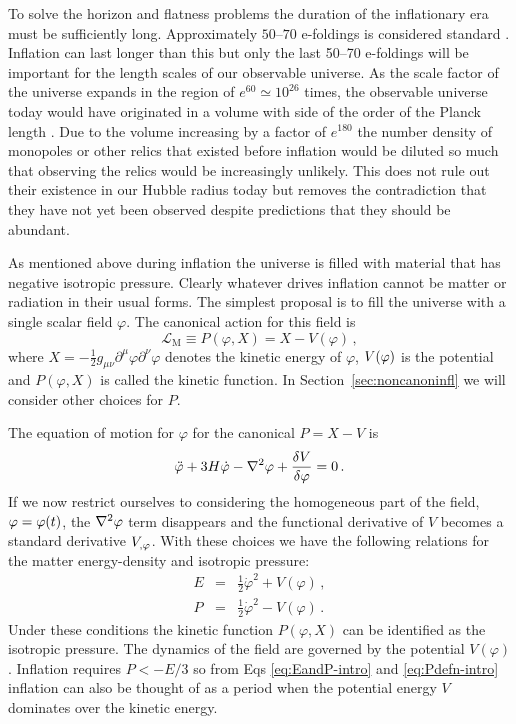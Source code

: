 To solve the horizon and flatness problems the duration of the inflationary era
must be
sufficiently long. Approximately $50$--$70$ e-foldings is considered standard
\cite{book:liddle}. Inflation
can last longer than this but only the last 50--70 e-foldings will be important
for the length scales of our observable universe. As the scale factor of the
universe expands
in the region of $e^{60}\simeq 10^{26}$ times, the observable universe
today would
have originated in a volume with side of the order of the Planck length
\cite{book:dodelson}.
Due to the volume increasing by a factor of $e^{180}$ the number density
of monopoles or other relics that existed before inflation would be
diluted so much that observing the relics would be increasingly unlikely. This
does not rule out their existence in our Hubble radius today but removes the
contradiction that they have not yet been observed despite predictions that
they should be abundant.


As mentioned above during inflation the universe is filled with material that
has negative isotropic pressure.
Clearly whatever drives inflation cannot be matter or radiation in their usual
forms. The simplest proposal is to fill the universe with a single scalar field
$\varphi$. The canonical action for this field is
\begin{equation}
\label{eq:phiaction-intro}
 \mathcal{L}_\mathrm{M} \equiv P(\varphi, X) = X -V(\varphi) \,,
\end{equation}
where $X=-\frac{1}{2}g_{\mu\nu}\partial^\mu\varphi \partial^\nu\varphi$ denotes
the kinetic energy of $\varphi$, $V(\varphi)$ is the potential and $P(\varphi, X)$
is called the kinetic
function. In Section~\ref{sec:noncanoninfl} we will consider other
choices for $P$. 

The equation of motion for $\varphi$ for the canonical $P=X-V$ is
% 
\begin{equation}
 \label{eq:phieom1-intro}
 \ddot{\varphi} + 3H\dot{\varphi} -\nabla^2 \varphi + \frac{\delta V}{\delta \varphi} = 0\,.
\end{equation}
% 
If we now restrict ourselves to considering the homogeneous part of the field,
$\varphi=\varphi(t)$, the $\nabla^2\varphi$ term disappears and the functional derivative
of $V$ becomes a standard derivative $V_{,\varphi}$. 
With these choices we have the following relations for the matter
energy-density and isotropic pressure:
% 
\begin{eqnarray}
\label{eq:EandP-intro}
 E &=& \frac{1}{2}\dot{\varphi}^2 + V(\varphi) \,,\\
\label{eq:Pdefn-intro}
 P &=& \frac{1}{2}\dot{\varphi}^2 - V(\varphi) \,.
\end{eqnarray}
% 
Under these conditions the kinetic function $P(\varphi, X)$ can be identified as
the isotropic pressure. The dynamics of the field are governed by the potential
$V(\varphi)$. Inflation requires $P<-E/3$ so from Eqs \eqref{eq:EandP-intro} and
\eqref{eq:Pdefn-intro} inflation
can also be thought of as a period when the potential energy $V$ dominates over
the kinetic energy. 


